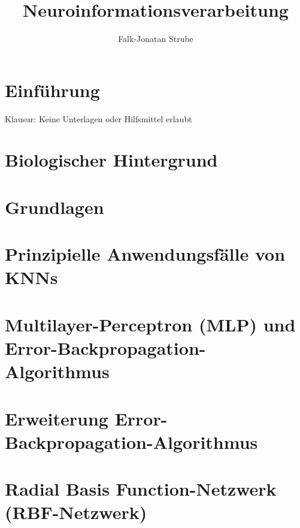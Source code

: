 \documentclass{scrreprt}
\title{Neuroinformations\-verarbeitung}
\author{Falk-Jonatan Strube}
\begin{document}
\maketitle
\tableofcontents

\chapter*{Einführung}
Klausur: Keine Unterlagen oder Hilfsmittel erlaubt

\setcounter{chapter}{-1}
\chapter{Biologischer Hintergrund}


\chapter{Grundlagen}


\chapter{Prinzipielle Anwendungsfälle von KNNs}




\chapter{Multilayer-Perceptron (MLP) und Error-Backpropagation-Algorithmus}


\chapter{Erweiterung Error-Backpropagation-Algorithmus}


\chapter{Radial Basis Function-Netzwerk (RBF-Netzwerk)}

\end{document}
